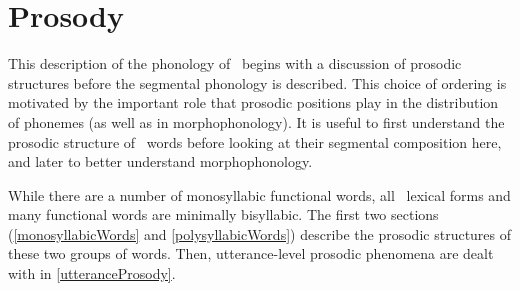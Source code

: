 


\chapter{Prosody}\label{ProsodicStructure}

This description of the phonology of \PS\ begins with a discussion of prosodic structures before the segmental phonology is described. This choice of ordering is motivated by the important role that prosodic positions play in the distribution of phonemes (as well as in morphophonology). It is useful to first understand the prosodic structure of \PS\ words before looking at their segmental composition here, and later to better understand morphophonology. 

While there are a number of monosyllabic functional words, all \PS\ lexical forms and many functional words are minimally bisyllabic. 
The first two sections (\SEC\ref{monosyllabicWords} and \SEC\ref{polysyllabicWords}) describe the prosodic structures of these two groups of words.  
Then, utterance-level prosodic phenomena are dealt with in \SEC\ref{utteranceProsody}.

\vfill

